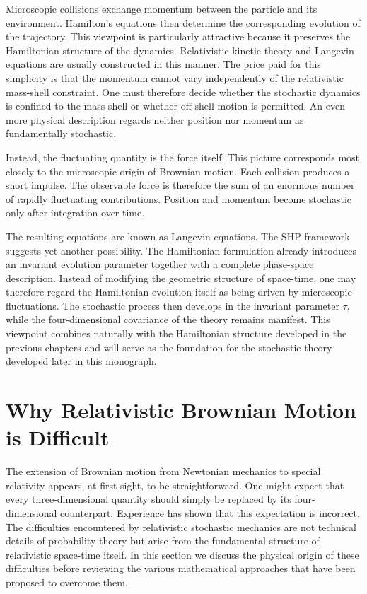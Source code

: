 Microscopic collisions exchange momentum between the particle and its
environment.
Hamilton's equations then determine the corresponding evolution of the
trajectory.
This viewpoint is particularly attractive because it preserves the
Hamiltonian structure of the dynamics.
Relativistic kinetic theory and Langevin equations are usually
constructed in this manner.
The price paid for this simplicity is that the momentum cannot vary
independently of the relativistic mass-shell constraint.
One must therefore decide whether the stochastic dynamics is confined to
the mass shell or whether off-shell motion is permitted.
An even more physical description regards neither position nor momentum
as fundamentally stochastic.

Instead, the fluctuating quantity is the force itself.
This picture corresponds most closely to the microscopic origin of
Brownian motion.
Each collision produces a short impulse.
The observable force is therefore the sum of an enormous number of
rapidly fluctuating contributions.
Position and momentum become stochastic only after integration over
time.

The resulting equations are known as Langevin equations.
The SHP framework suggests yet another possibility.
The Hamiltonian formulation already introduces an invariant evolution
parameter together with a complete phase-space description.
Instead of modifying the geometric structure of space-time, one may
therefore regard the Hamiltonian evolution itself as being driven by
microscopic fluctuations.
The stochastic process then develops in the invariant parameter
\(\tau\), while the four-dimensional covariance of the theory remains
manifest.
This viewpoint combines naturally with the Hamiltonian structure
developed in the previous chapters and will serve as the foundation for
the stochastic theory developed later in this monograph.
\section{Why Relativistic Brownian Motion is Difficult}
The extension of Brownian motion from Newtonian mechanics to special
relativity appears, at first sight, to be straightforward. One might
expect that every three-dimensional quantity should simply be replaced
by its four-dimensional counterpart.
Experience has shown that this expectation is incorrect.
The difficulties encountered by relativistic stochastic mechanics are
not technical details of probability theory but arise from the
fundamental structure of relativistic space-time itself.
In this section we discuss the physical origin of these difficulties
before reviewing the various mathematical approaches that have been
proposed to overcome them.
